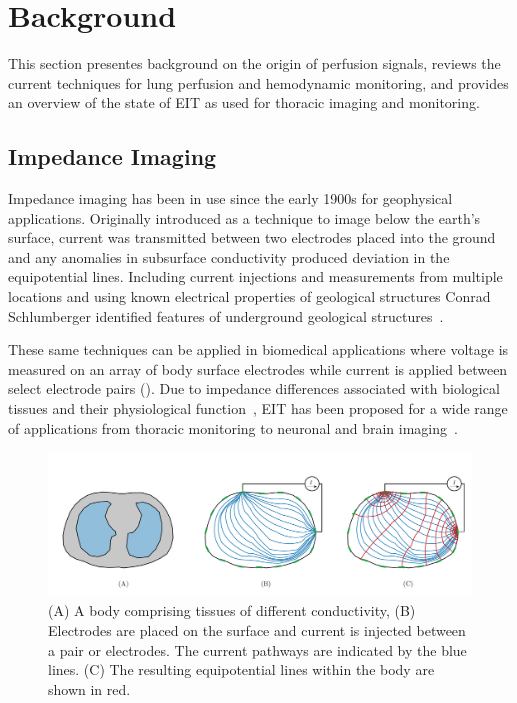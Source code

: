 \chapter{Background}
This section presentes background on the 
origin of perfusion signals, reviews the current techniques for lung perfusion and hemodynamic
monitoring, and provides an overview 
of the state of EIT as used for thoracic imaging and monitoring.

\section{Impedance Imaging}
\label{sec:impedance_imaging}
Impedance imaging has been in use since the early 1900s for geophysical applications.  
Originally introduced as a technique to image below the earth’s surface, 
current was transmitted between two electrodes placed into the ground and any 
anomalies in subsurface conductivity produced deviation 
in the equipotential lines. 
Including current injections and measurements from multiple locations and using known 
electrical properties of geological structures Conrad Schlumberger identified
features of underground geological structures~\parencite{allaud_schlumberger_1977}.

These same techniques can be applied in biomedical applications where
voltage is measured on an array of body surface electrodes 
while current is applied between select electrode pairs (). 
Due to impedance differences associated with biological tissues and their physiological 
function~\parencite{geddes_specific_1967,mcadams_tissue_1995},
EIT has been proposed for a wide range of applications from thoracic monitoring
\parencite{frerichs_chest_2017} to neuronal and 
brain imaging~\parencite{holder_electrical_1992}.

\begin{figure}
    \centering
   \includegraphics[width=\textwidth]{chapter2-background/imgs/current_and_equipotential_lines.pdf}
   \caption[Current and Equipotential lines]{\label{fig:cur_equip_line} 
   (A) A body comprising tissues of different conductivity, (B) Electrodes are placed on the surface 
   and current is injected between a pair or electrodes. The current pathways are indicated 
   by the blue lines. (C) The resulting equipotential lines within the body are shown in red.}
\end{figure}

